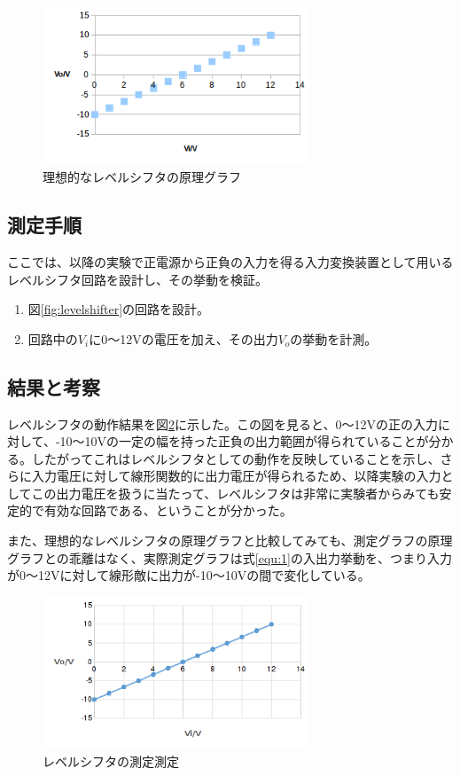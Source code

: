 \documentclass[11pt,a4j]{jsarticle}
\begin{document}
   \begin{figure}[htbp]
  \centering
  \includegraphics[width=8cm,clip]{risou_levelshifter.png}
  \caption{理想的なレベルシフタの原理グラフ}
  \label{fig:risou_levelshifter}
 \end{figure}
   
  \subsection{測定手順}
   ここでは、以降の実験で正電源から正負の入力を得る入力変換装置として用いるレベルシフタ回路を設計し、その挙動を検証。
   \begin{enumerate}
   \item 図\ref{fig:levelshifter}の回路を設計。
   \item 回路中の$V_i$に0～12Vの電圧を加え、その出力$V_o$の挙動を計測。
   \end{enumerate}
   
   
  \subsection{結果と考察} \label{sec:le_kousatu}
  レベルシフタの動作結果を図\ref{fig:1_0}に示した。この図を見ると、0～12Vの正の入力に対して、-10～10Vの一定の幅を持った正負の出力範囲が得られていることが分かる。したがってこれはレベルシフタとしての動作を反映していることを示し、さらに入力電圧に対して線形関数的に出力電圧が得られるため、以降実験の入力としてこの出力電圧を扱うに当たって、レベルシフタは非常に実験者からみても安定的で有効な回路である、ということが分かった。
  
  また、理想的なレベルシフタの原理グラフと比較してみても、測定グラフの原理グラフとの乖離はなく、実際測定グラフは式\ref{equ:1}の入出力挙動を、つまり入力が0～12Vに対して線形敵に出力が-10～10Vの間で変化している。
  
   \begin{figure}[htbp]
  \centering
  \includegraphics[width=8cm,clip]{1_0.png}
  \caption{レベルシフタの測定測定}
  \label{fig:1_0}
 \end{figure}%
   
\end{document}
